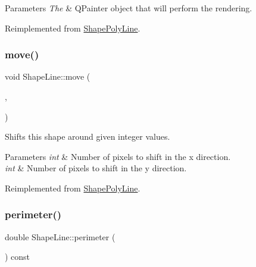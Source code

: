 \begin{DoxyParams}{Parameters}
{\em The} & Q\+Painter object that will perform the rendering. \\
\hline
\end{DoxyParams}


Reimplemented from \mbox{\hyperlink{class_shape_poly_line_a6aaca4bd2767644f9ea0f68065fa1f98}{Shape\+Poly\+Line}}.

\mbox{\label{class_shape_line_a5b6d9bcf7ed64ab2454d5efa66486ee9}} 
\subsubsection{\texorpdfstring{move()}{move()}}
{\footnotesize\ttfamily void Shape\+Line\+::move (\begin{DoxyParamCaption}\item[{int}]{,  }\item[{int}]{ }\end{DoxyParamCaption})\hspace{0.3cm}{\ttfamily [virtual]}}



Shifts this shape around given integer values. 


\begin{DoxyParams}{Parameters}
{\em int} & Number of pixels to shift in the x direction. \\
\hline
{\em int} & Number of pixels to shift in the y direction. \\
\hline
\end{DoxyParams}


Reimplemented from \mbox{\hyperlink{class_shape_poly_line_a7c1971596b171c4c08ec5657b6592354}{Shape\+Poly\+Line}}.

\mbox{\label{class_shape_line_a68b22013926993e9bd9c2d146519a5af}} 
\subsubsection{\texorpdfstring{perimeter()}{perimeter()}}
{\footnotesize\ttfamily double Shape\+Line\+::perimeter (\begin{DoxyParamCaption}{ }\end{DoxyParamCaption}) const\hspace{0.3cm}{\ttfamily [virtual]}}



